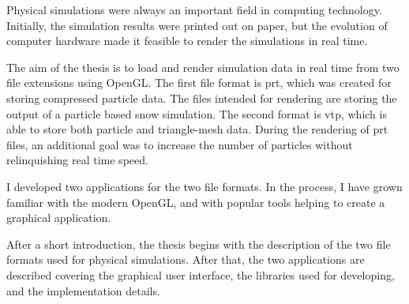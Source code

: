 Physical simulations were always an important field in computing technology. 
Initially, the simulation results were printed out on paper, 
but the evolution of computer hardware made 
it feasible to render the simulations in real time. 

The aim of the thesis is to load and 
render simulation data in real time from two file extensions 
using OpenGL. 
The first file format is prt, 
which was created for storing compressed particle data. 
The files intended for rendering 
are storing the output of a particle based snow simulation. 
The second format is vtp, 
which is able to store both particle and triangle-mesh data. 
During the rendering of prt files, 
an additional goal was to increase the number of particles 
without relinquishing real time speed.
 
I developed two applications for the two file formats. 
In the process, 
I have grown familiar with the modern OpenGL, 
and with popular tools helping to create a graphical application. 

After a short introduction, 
the thesis begins with the 
description of the two file formats used for physical simulations. 
After that, 
the two applications are described covering the graphical user interface, 
the libraries used for developing, and the implementation details.









